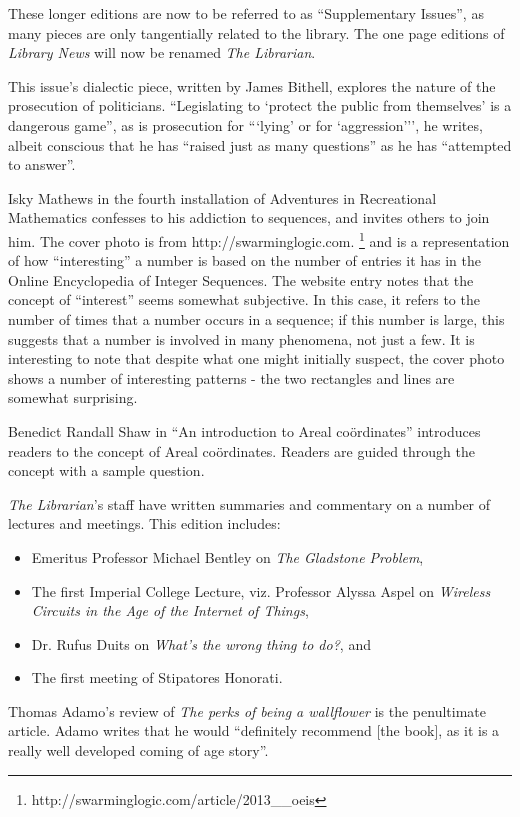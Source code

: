 These longer editions are now to be referred to as ``Supplementary Issues'', as many pieces are only tangentially related to the library. The one page editions of \textit{Library News} will now be renamed \textit{The Librarian}.

This issue's dialectic piece, written by James Bithell, explores the nature of the prosecution of politicians. ``Legislating to `protect the public from themselves' is a dangerous game'', as is prosecution for ```lying' or for `aggression{'}'', he writes, albeit conscious that he has ``raised just as many questions'' as he has ``attempted to answer''.

Isky Mathews in the fourth installation of Adventures in Recreational Mathematics confesses to his addiction to sequences, and invites others to join him. The cover photo is from http://swarminglogic.com. \footnote{http://swarminglogic.com/article/2013__oeis} and is a representation of how ``interesting'' a number is based on the number of entries it has in the Online Encyclopedia of Integer Sequences. The website entry notes that the concept of ``interest'' seems somewhat subjective. In this case, it refers to the number of times that a number occurs in a sequence; if this number is large, this suggests that a number is involved in many phenomena, not just a few. It is interesting to note that despite what one might initially suspect, the cover photo shows a number of interesting patterns - the two rectangles and lines are somewhat surprising. 

Benedict Randall Shaw in ``An introduction to Areal coördinates'' introduces readers to the concept of Areal coördinates. Readers are guided through the concept with a sample question.

\textit{The Librarian}'s staff have written summaries and commentary on a number of lectures and meetings. This edition includes:
\begin{itemize}
	\item Emeritus Professor Michael Bentley on \textit{The Gladstone Problem},
	\item The first Imperial College Lecture, viz. Professor Alyssa Aspel on \textit{Wireless Circuits in the Age of the Internet of Things},
	\item Dr. Rufus Duits on \textit{What's the wrong thing to do?}, and
	\item The first meeting of Stipatores Honorati.
\end{itemize}

Thomas Adamo's review of \textit{The perks of being a wallflower} is the penultimate article. Adamo writes that he would ``definitely recommend [the book], as it is a really well developed coming of age story''.

